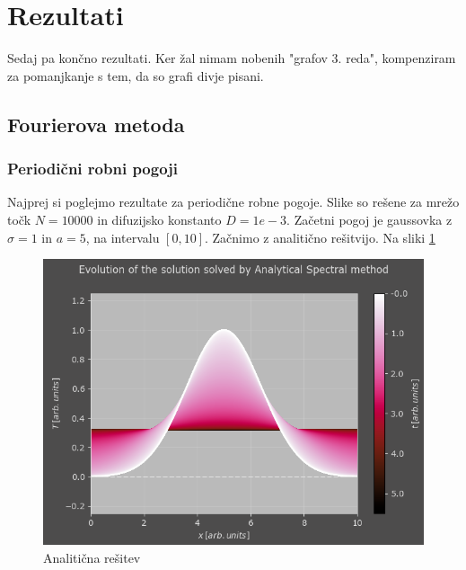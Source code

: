 \documentclass[a4paper]{article}
\begin{document}
\section{Rezultati}
Sedaj pa končno rezultati. Ker žal nimam nobenih "grafov 3. reda", kompenziram za pomanjkanje s tem, da
so grafi divje pisani.\\

\subsection{Fourierova metoda}
\subsubsection{Periodični robni pogoji}
Najprej si poglejmo rezultate za periodične robne pogoje. Slike so rešene za mrežo točk $N=10000$ in difuzijsko
konstanto $D=1e-3$. Začetni pogoj je gaussovka z $\sigma=1$ in $a=5$, na intervalu $[0, 10]$. 
Začnimo z analitično rešitvijo. Na sliki \ref{fig:1}

\begin{figure}[H]
    \centering
        \includegraphics[width=\linewidth]{./images/S_Analytic_P.png}
        \caption{Analitična rešitev}
    \label{fig:1}
\end{figure}
\end{document}
